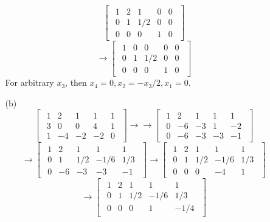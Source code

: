 \begin{itemize}
\begin{itemize}
$$\begin{bmatrix}
\begin{array}{cccc|c}
1 & 2 & 1 & 0 & 0 \\
0 & 1 & 1/2 & 0 & 0 \\
0 & 0 & 0 & 1 & 0
\end{array}
\end{bmatrix}$$
$$\rightarrow \begin{bmatrix}
\begin{array}{cccc|c}
1 & 0 & 0 & 0 & 0 \\
0 & 1 & 1/2 & 0 & 0 \\
0 & 0 & 0 & 1 & 0
\end{array}
\end{bmatrix}$$
For arbitrary $x_3$, then $x_4 = 0, x_2 = -x_3/2, x_1 = 0$.
\item[(b)]
$$\begin{bmatrix}
\begin{array}{cccc|c}
1 & 2 & 1 & 1 & 1 \\
3 & 0 & 0 & 4 & 1 \\
1 & -4 & -2 & -2 & 0
\end{array}
\end{bmatrix} \rightarrow\rightarrow \begin{bmatrix}
\begin{array}{cccc|c}
1 & 2 & 1 & 1 & 1 \\
0 & -6 & -3 & 1 & -2 \\
0 & -6 & -3 & -3 & -1
\end{array}
\end{bmatrix}$$
$$ \rightarrow \begin{bmatrix}
\begin{array}{cccc|c}
1 & 2 & 1 & 1 & 1 \\
0 & 1 & 1/2 & -1/6 & 1/3 \\
0 & -6 & -3 & -3 & -1
\end{array}
\end{bmatrix} \rightarrow \begin{bmatrix}
\begin{array}{cccc|c}
1 & 2 & 1 & 1 & 1 \\
0 & 1 & 1/2 & -1/6 & 1/3 \\
0 & 0 & 0 & -4 & 1
\end{array}
\end{bmatrix}$$
$$\rightarrow \begin{bmatrix}
\begin{array}{cccc|c}
1 & 2 & 1 & 1 & 1 \\
0 & 1 & 1/2 & -1/6 & 1/3 \\
0 & 0 & 0 & 1 & -1/4
\end{array}

\end{bmatrix}$$
\end{itemize}
\end{itemize}
